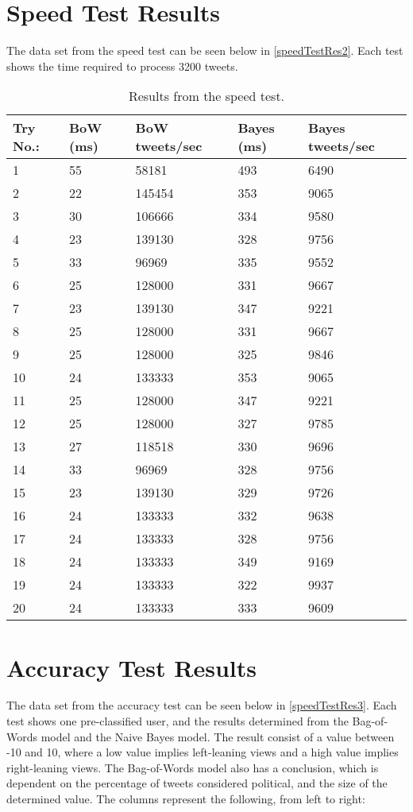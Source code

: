 \chapter{Speed Test Results}\label{app:speedTest}
The data set from the speed test can be seen below in \autoref{speedTestRes2}.
Each test shows the time required to process 3200 tweets.

\begin{table}[H]\centering
\begin{tabular}{|l|l|l|l|l|}
\hline
Try No.:	&	BoW (ms)	&	BoW tweets/sec	&	Bayes (ms)	&	Bayes tweets/sec	\\\hline
1	&	55	&	58181	&	493	&	6490 \\\hline
2	&	22	&	145454	&	353	&	9065 \\\hline
3	&	30	&	106666	&	334	&	9580 \\\hline
4	&	23	&	139130	&	328	&	9756 \\\hline
5	&	33	&	96969	&	335	&	9552 \\\hline
6	&	25	&	128000	&	331	&	9667 \\\hline
7	&	23	&	139130	&	347	&	9221 \\\hline
8	&	25	&	128000	&	331	&	9667 \\\hline
9	&	25	&	128000	&	325	&	9846 \\\hline
10	&	24	&	133333	&	353	&	9065 \\\hline
11	&	25	&	128000	&	347	&	9221 \\\hline
12	&	25	&	128000	&	327	&	9785 \\\hline
13	&	27	&	118518	&	330	&	9696 \\\hline
14	&	33	&	96969	&	328	&	9756 \\\hline
15	&	23	&	139130	&	329	&	9726 \\\hline
16	&	24	&	133333	&	332	&	9638 \\\hline
17	&	24	&	133333	&	328	&	9756 \\\hline
18	&	24	&	133333	&	349	&	9169 \\\hline
19	&	24	&	133333	&	322	&	9937 \\\hline
20	&	24	&	133333	&	333	&	9609 \\\hline
\end{tabular}
\caption{Results from the speed test.}
\label{speedTestRes2}
\end{table}

\chapter{Accuracy Test Results}\label{app:AccuracyTest}
The data set from the accuracy test can be seen below in
\autoref{speedTestRes3}.
Each test shows one pre-classified user, and the results determined from the
Bag-of-Words model and the Naive Bayes model. The result consist of a value
between -10 and 10, where a low value implies left-leaning views and a high
value implies right-leaning views. The Bag-of-Words model also has a
conclusion, which is dependent on the percentage of tweets considered political,
and the size of the determined value. The columns represent the following, from
left to right:\nl

